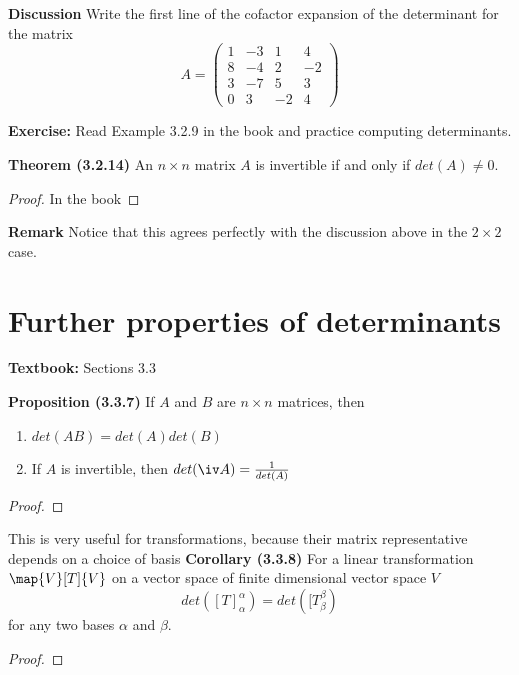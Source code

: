 \documentclass[letterpaper, 10pt]{article}
\begin{document}
\vspace{40pt}
\lb
\textbf{Discussion}
\lb
Write the first line of the cofactor expansion of the determinant for the matrix
\[ A = \begin{pmatrix} 
1 & -3 & 1 & 4 \\ 8 & -4 & 2 & -2 \\ 3 & -7 & 5 & 3 \\ 0 & 3 & -2 & 4 \end{pmatrix} \]




\newpage

\lb
\textbf{Exercise: } Read Example 3.2.9 in the book and practice computing determinants.
\lb

\vspace{100pt}
\lb
\textbf{Theorem (3.2.14)}
\lb
An $n \times n$ matrix $A$ is invertible if and only if $det(A) \neq 0$.
\begin{proof}
    In the book
\end{proof}

\lb
\textbf{Remark}
\lb
Notice that this agrees perfectly with the discussion above in the $2\times 2$ case.











\newpage
\section*{Further properties of determinants}%
\textbf{Textbook:} Sections 3.3


\lb
\textbf{Proposition (3.3.7)}
\lb
If $A$ and $B$ are $n \times n$ matrices, then
\begin{enumerate}
    \item $ det(AB) = det(A) det(B) $
    \item If $A$ is invertible, then $ det(\iv A) = \frac{1}{det(A)} $
\end{enumerate}
\begin{proof}
\end{proof}
\vspace{300pt}




\lb
This is very useful for transformations, because their matrix representative depends on a choice
of basis
\lb
\textbf{Corollary (3.3.8)}
\lb
For a linear transformation $\map{V}[T]{V}$ on a vector space of finite dimensional vector
space $V$
\[ det( [T]_α^α) = det([T_β^β) \]
for any two bases $α$ and $β$.
\begin{proof}
\end{proof}
\end{document}
